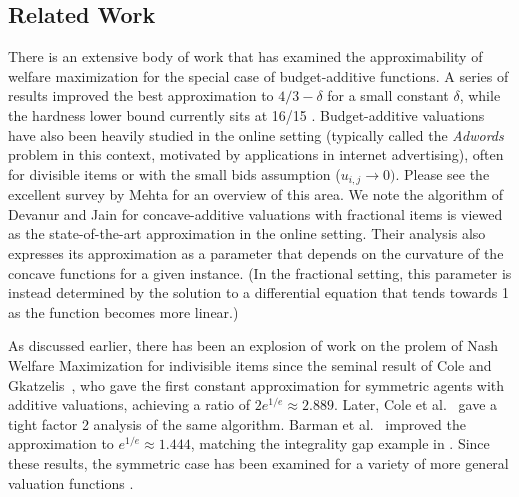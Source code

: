\subsection{Related Work}


There is an extensive body of work that has examined the approximability of  welfare maximization for the special case of budget-additive functions. 
A series of results \cite{garg2001approximation, andelman2004auctions, azar2008improved, chakrabarty2010approximability, kalaitzis2015configuration} improved the best approximation to $4/3 - \delta$ for a small constant $\delta$, while the hardness lower bound currently sits at 16/15 \cite{chakrabarty2010approximability}. 
Budget-additive valuations have also been heavily studied in the online setting (typically called the {\em Adwords} problem in this context, motivated by applications in internet advertising), often for divisible items or with the small bids assumption ($u_{i,j} \rightarrow 0)$. 
Please see the excellent survey by Mehta \cite{mehta2013online} for an overview of this area.
We note the algorithm of Devanur and Jain \cite{devanur2012online} for concave-additive valuations with fractional items is viewed as the state-of-the-art approximation in the online setting. 
Their analysis also expresses its approximation as a parameter that depends on the curvature of the concave functions for a  given instance. 
(In the fractional setting, this parameter is instead determined by the solution to a differential equation that tends towards 1 as the function becomes more linear.)

As discussed earlier, there has been an explosion of work on the prolem of Nash Welfare Maximization for indivisible items since the seminal result of Cole and Gkatzelis~\cite{cole2015approximating}, 
who gave the first constant approximation for symmetric agents with additive valuations, achieving a ratio of $2e^{1/e} \approx 2.889$. Later, Cole et al.~\cite{cole2017convex} gave a tight factor 2 analysis of the same algorithm.
 Barman et al.~\cite{barman2018finding} improved the approximation to $e^{1/e} \approx 1.444$, matching the integrality gap example in \cite{cole2017convex}. Since these results, the symmetric case has been examined for a variety of more general valuation functions \cite{garg2018approximating, anari2018nash, garg2021approximating, li2021constant, chaudhury2018fair, barman2021approximating}.
 
